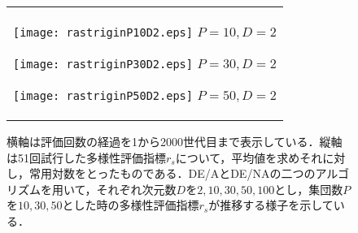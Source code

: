 \documentclass[a4paper,11pt,oneside,openany]{jsbook}
\begin{document}
\newpage
\begin{figure}[htbp]
  \caption{横軸は評価回数の経過を1から2000世代目まで表示している．縦軸は51回試行した多様性評価指標$r_s$について，平均値を求めそれに対し，常用対数をとったものである．DE/AとDE/NAの二つのアルゴリズムを用いて，それぞれ次元数$D$を$2,10,30,50,100$とし，集団数$P$を$10,30,50$とした時の多様性評価指標$r_s$が推移する様子を示している．}
  \begin{center}
    \begin{tabular}{c}
      \begin{minipage}{0.33\hsize}
        \begin{center}
          \texttt{[image: rastriginP10D2.eps]}
          \hspace{1.2cm}$P=10, D=2
 $       \end{center}
      \end{minipage}

      \begin{minipage}{0.33\hsize}
        \begin{center}
          \texttt{[image: rastriginP30D2.eps]}
          \hspace{1.2cm}$P=30, D=2
 $       \end{center}
      \end{minipage}

      \begin{minipage}{0.33\hsize}
        \begin{center}
          \texttt{[image: rastriginP50D2.eps]}
          \hspace{1.2cm}$P=50, D=2
 $       \end{center}
      \end{minipage}
    \end{tabular}
  \end{center}
\end{figure}
\end{document}
